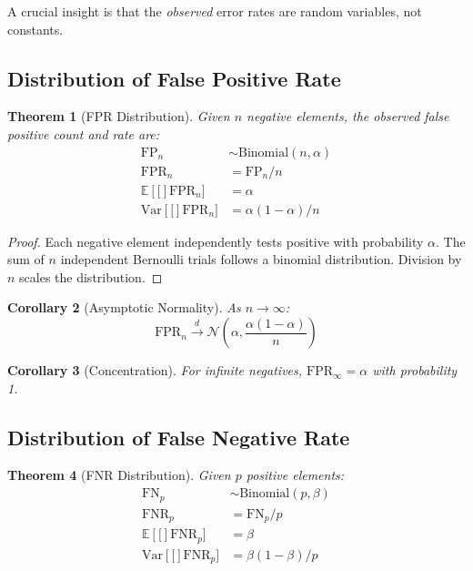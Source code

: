 \documentclass[11pt,final,hidelinks]{article}
\newtheorem{theorem}{Theorem}[section]
\newtheorem{corollary}[theorem]{Corollary}
\newcommand{\fprate}{\alpha}
\newcommand{\fnrate}{\beta}
\newcommand{\Expect}[1]{\mathbb{E}\left[#1\right]}
\newcommand{\Var}[1]{\text{Var}\left[#1\right]}
\newcommand{\bindist}{\text{Binomial}}
\newcommand{\normaldist}{\mathcal{N}}
\newcommand{\FP}{\text{FP}}
\newcommand{\FN}{\text{FN}}
\newcommand{\FPR}{\text{FPR}}
\newcommand{\FNR}{\text{FNR}}
\begin{document}
A crucial insight is that the \textit{observed} error rates are random variables, not constants.

\subsection{Distribution of False Positive Rate}

\begin{theorem}[FPR Distribution]
Given $n$ negative elements, the observed false positive count and rate are:
\begin{align}
\FP_n &\sim \bindist(n, \fprate) \\
\FPR_n &= \FP_n/n \\
\Expect[\FPR_n] &= \fprate \\
\Var[\FPR_n] &= \fprate(1-\fprate)/n
\end{align}
\end{theorem}

\begin{proof}
Each negative element independently tests positive with probability $\fprate$. The sum of $n$ independent Bernoulli trials follows a binomial distribution. Division by $n$ scales the distribution.
\end{proof}

\begin{corollary}[Asymptotic Normality]
As $n \to \infty$:
\begin{equation}
\FPR_n \xrightarrow{d} \normaldist\left(\fprate, \frac{\fprate(1-\fprate)}{n}\right)
\end{equation}
\end{corollary}

\begin{corollary}[Concentration]
For infinite negatives, $\FPR_\infty = \fprate$ with probability 1.
\end{corollary}

\subsection{Distribution of False Negative Rate}

\begin{theorem}[FNR Distribution]
Given $p$ positive elements:
\begin{align}
\FN_p &\sim \bindist(p, \fnrate) \\
\FNR_p &= \FN_p/p \\
\Expect[\FNR_p] &= \fnrate \\
\Var[\FNR_p] &= \fnrate(1-\fnrate)/p
\end{align}
\end{theorem}
\end{document}
